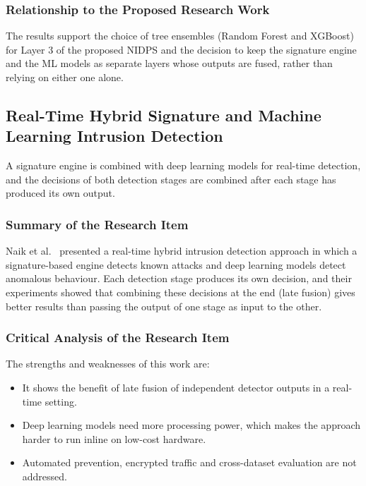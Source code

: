 \subsubsection{Relationship to the Proposed Research Work}\label{sec:3.2.5.3}

\noindent The results support the choice of tree ensembles (Random Forest and XGBoost) for Layer 3 of the proposed NIDPS and the decision to keep the signature engine and the ML models as separate layers whose outputs are fused, rather than relying on either one alone.

\subsection{Real-Time Hybrid Signature and Machine Learning Intrusion Detection}\label{sec:3.2.6}

\noindent A signature engine is combined with deep learning models for real-time detection, and the decisions of both detection stages are combined after each stage has produced its own output.

\subsubsection{Summary of the Research Item}\label{sec:3.2.6.1}

\noindent Naik et al.~\cite{lr:naik2025} presented a real-time hybrid intrusion detection approach in which a signature-based engine detects known attacks and deep learning models detect anomalous behaviour. Each detection stage produces its own decision, and their experiments showed that combining these decisions at the end (late fusion) gives better results than passing the output of one stage as input to the other.

\subsubsection{Critical Analysis of the Research Item}\label{sec:3.2.6.2}

\noindent The strengths and weaknesses of this work are:

\begin{itemize}
\item It shows the benefit of late fusion of independent detector outputs in a real-time setting.
\item Deep learning models need more processing power, which makes the approach harder to run inline on low-cost hardware.
\item Automated prevention, encrypted traffic and cross-dataset evaluation are not addressed.
\end{itemize}

